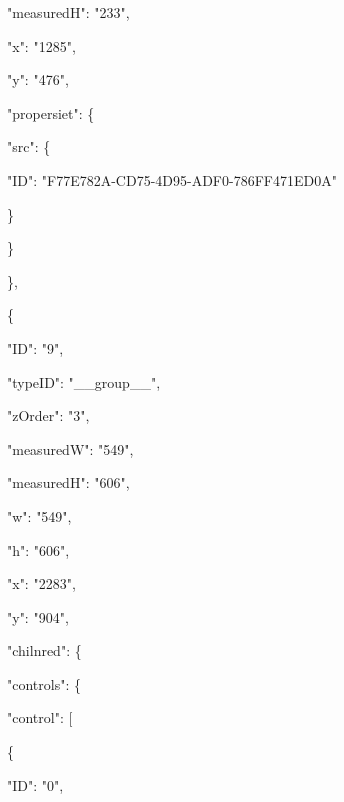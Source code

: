 \documentclass[13pt]{article}
\begin{document}
{\raggedright
{\footnotesize                     "measuredH": "233",}
}

{\raggedright
{\footnotesize                     "x": "1285",}
}

{\raggedright
{\footnotesize                     "y": "476",}
}

{\raggedright
{\footnotesize                     "propersiet": \{}
}

{\raggedright
{\footnotesize                         "src": \{}
}

{\raggedright
{\footnotesize                             "ID":
"F77E782A-CD75-4D95-ADF0-786FF471ED0A"}
}

{\raggedright
{\footnotesize                         \}}
}

{\raggedright
{\footnotesize                     \}}
}

{\raggedright
{\footnotesize                 \},}
}

{\raggedright
{\footnotesize                 \{}
}

{\raggedright
{\footnotesize                     "ID": "9",}
}

{\raggedright
{\footnotesize                     "typeID": "\_\_group\_\_",}
}

{\raggedright
{\footnotesize                     "zOrder": "3",}
}

{\raggedright
{\footnotesize                     "measuredW": "549",}
}

{\raggedright
{\footnotesize                     "measuredH": "606",}
}

{\raggedright
{\footnotesize                     "w": "549",}
}

{\raggedright
{\footnotesize                     "h": "606",}
}

{\raggedright
{\footnotesize                     "x": "2283",}
}

{\raggedright
{\footnotesize                     "y": "904",}
}

{\raggedright
{\footnotesize                     "chilnred": \{}
}

{\raggedright
{\footnotesize                         "controls": \{}
}

{\raggedright
{\footnotesize                             "control": [}
}

{\raggedright
{\footnotesize                                 \{}
}

{\raggedright
{\footnotesize                                     "ID": "0",}
}
\end{document}

